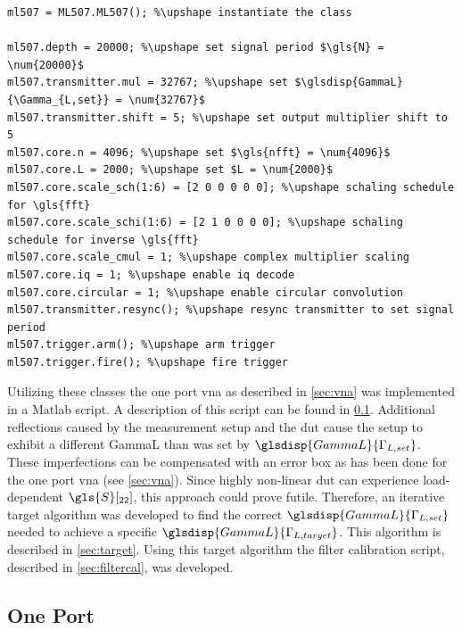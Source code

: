 \documentclass[12pt,a4paper,parskip=full,abstract=true,BCOR=12mm]{scrreprt}
\newcommand{\hack}{}
\begin{document}
\begin{lstlisting}[float=htb,caption={Example usage of the Matlab driver for the hardware},label=src:mdriver,basicstyle=\hack\scriptsize,texcl=true]
ml507 = ML507.ML507(); %\upshape instantiate the class

ml507.depth = 20000; %\upshape set signal period $\gls{N} = \num{20000}$
ml507.transmitter.mul = 32767; %\upshape set $\glsdisp{GammaL}{\Gamma_{L,set}} = \num{32767}$
ml507.transmitter.shift = 5; %\upshape set output multiplier shift to 5
ml507.core.n = 4096; %\upshape set $\gls{nfft} = \num{4096}$
ml507.core.L = 2000; %\upshape set $L = \num{2000}$
ml507.core.scale_sch(1:6) = [2 0 0 0 0 0]; %\upshape schaling schedule for \gls{fft}
ml507.core.scale_schi(1:6) = [2 1 0 0 0 0]; %\upshape schaling schedule for inverse \gls{fft}
ml507.core.scale_cmul = 1; %\upshape complex multiplier scaling
ml507.core.iq = 1; %\upshape enable iq decode
ml507.core.circular = 1; %\upshape enable circular convolution
ml507.transmitter.resync(); %\upshape resync transmitter to set signal period
ml507.trigger.arm(); %\upshape arm trigger
ml507.trigger.fire(); %\upshape fire trigger
\end{lstlisting}

Utilizing these classes the one port \gls{vna} as described in \cref{sec:vna}
was implemented in a Matlab script. A description of this script can be found
in \cref{sec:mvna}. Additional reflections caused by the measurement setup and the \gls{dut} cause
the setup to exhibit a different \gls{GammaL} than was set by
$\glsdisp{GammaL}{\Gamma_{L,set}}$. These imperfections can be compensated with an error
box as has been done for the one port \gls{vna} (see \cref{sec:vna}).
Since highly non-linear \gls{dut} can experience load-dependent
$\gls{S}[_{22}]$, this approach could prove futile. Therefore, an iterative target algorithm
was developed to find the correct $\glsdisp{GammaL}{\Gamma_{L,set}}$ needed
to achieve a specific $\glsdisp{GammaL}{\Gamma_{L,target}}$. This algorithm
is described in \cref{sec:target}. Using this target algorithm the
filter calibration script, described in \cref{sec:filtercal}, was developed.


\subsection{One Port }
\label{sec:mvna}
\end{document}
